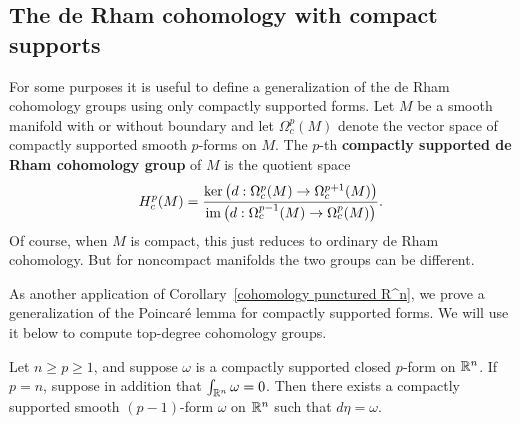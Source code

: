 \subsection{The de Rham cohomology with compact supports}
For some purposes it is useful to define a generalization of the de Rham cohomology groups using only compactly supported forms. Let $M$ be a smooth manifold with or 
without boundary and let $\Omega^p_c(M)$ denote the vector space of compactly supported smooth $p$-forms on $M$. The $p$-th \textbf{compactly supported de Rham cohomology group} 
of $M$ is the quotient space
\[H^p_c(M)=\frac{\ker\big(d:\Omega^p_c(M)\to\Omega^{p+1}_c(M)\big)}{\mathrm{im}\,\big(d:\Omega^{p-1}_c(M)\to\Omega^{p}_c(M)\big)}.\]
Of course, when $M$ is compact, this just reduces to ordinary de Rham cohomology. But for noncompact manifolds the two groups can be different.\par
As another application of Corollary~\ref{cohomology punctured R^n}, we prove a generalization of the Poincar\'e lemma for compactly supported forms. We will use it below to compute top-degree cohomology groups.
\begin{lemma}\label{Poincare lem compact suup}
Let $n\geq p\geq1$, and suppose $\omega$ is a compactly supported closed $p$-form on $\mathbb{R}^n$. If $p=n$, suppose in addition that $\int_{\mathbb{R}^n}\omega=0$. Then there exists a compactly supported smooth $(p-1)$-form $\omega$ on $\mathbb{R}^n$ such that $d\eta=\omega$.
\end{lemma}
